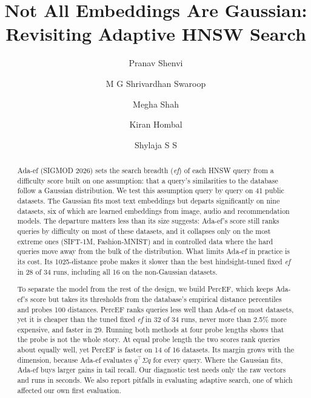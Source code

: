 \documentclass[sigconf, nonacm]{acmart}
\newcommand{\ef}{\textit{ef}}
\begin{document}
\title{Not All Embeddings Are Gaussian: Revisiting Adaptive HNSW Search}

\author{Pranav Shenvi}
\author{M G Shrivardhan Swaroop}
\author{Megha Shah}
\author{Kiran Hombal}
\author{Shylaja S S}

\begin{abstract}
Ada-ef (SIGMOD 2026) sets the search breadth (\ef{}) of each HNSW query from a difficulty score
built on one assumption: that a query's similarities to the database follow a Gaussian
distribution. We test this assumption query by query on 41 public datasets. The Gaussian fits most
text embeddings but departs significantly on nine datasets, six of which are learned embeddings from
image, audio and recommendation models. The departure matters less than its size suggests: Ada-ef's
score still ranks queries by difficulty on most of these datasets, and it collapses only on the most
extreme ones (SIFT-1M, Fashion-MNIST) and in controlled data where the hard queries move away from
the bulk of the distribution. What limits Ada-ef in practice is its cost. Its 1025-distance probe
makes it slower than the best hindsight-tuned fixed \ef{} in 28 of 34 runs, including all 16 on the
non-Gaussian datasets.

To separate the model from the rest of the design, we build PercEF, which keeps Ada-ef's score but
takes its thresholds from the database's empirical distance percentiles and probes 100 distances.
PercEF ranks queries less well than Ada-ef on most datasets, yet it is cheaper than the tuned fixed
\ef{} in 32 of 34 runs, never more than 2.5\% more expensive, and faster in 29. Running both methods
at four probe lengths shows that the probe is not the whole story. At equal probe length the two
scores rank queries about equally well, yet PercEF is faster on 14 of 16 datasets. Its margin grows
with the dimension, because Ada-ef evaluates $q^\top\Sigma q$ for every query. Where the Gaussian fits,
Ada-ef buys larger gains in tail recall. Our diagnostic test needs only the raw vectors and runs in
seconds. We also report pitfalls in evaluating adaptive search, one of which affected our own first
evaluation.
\end{abstract}
\end{document}
